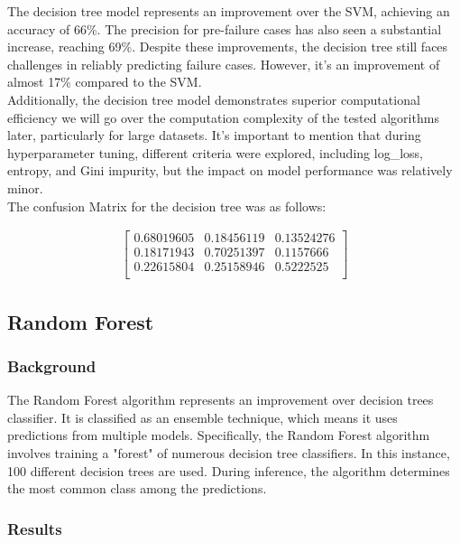 \documentclass{article}
\begin{document}
The decision tree model represents an improvement over the SVM, achieving an accuracy of 66\%. The precision for pre-failure cases has also seen a substantial increase, reaching 69\%. Despite these improvements, the decision tree still faces challenges in reliably predicting failure cases. However, it's an improvement of almost 17\% compared to the SVM. \\

Additionally, the decision tree model demonstrates superior computational efficiency we will go over the computation complexity of the tested algorithms later, particularly for large datasets. It's important to mention that during hyperparameter tuning, different criteria were explored, including log\_loss, entropy, and Gini impurity, but the impact on model performance was relatively minor.\\

The confusion Matrix for the decision tree was as follows:

\begin{align*}
\begin{bmatrix}
0.68019605 & 0.18456119 & 0.13524276 \\
0.18171943 & 0.70251397 & 0.1157666 \\
0.22615804 & 0.25158946 & 0.5222525 \\
\end{bmatrix}
\end{align*}

\subsection{Random Forest}
\subsubsection{Background}

The Random Forest algorithm represents an improvement over  decision trees classifier. It is classified as an ensemble technique, which means it uses predictions from multiple models. Specifically, the Random Forest algorithm involves training a "forest" of numerous decision tree classifiers. In this instance, 100 different decision trees are used. During inference, the algorithm determines the most common class among the predictions.

\subsubsection{Results}
\end{document}
